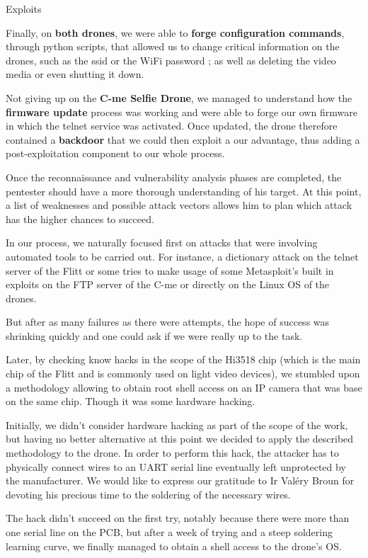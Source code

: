 \begin{chaptercover}{Exploits}
\begin{summary}
Finally, on \textbf{both drones}, we were able to \textbf{forge configuration commands}, through python scripts, that allowed us to change critical information on the drones, such as the \acrshort{ssid} or the WiFi password ; as well as deleting the video media or even shutting it down.

Not giving up on the \textbf{C-me Selfie Drone}, we managed to understand how the \textbf{firmware update} process was working and were able to forge our own firmware in which the telnet service was activated. Once updated, the drone therefore contained a \textbf{backdoor} that we could then exploit a our advantage, thus adding a post-exploitation component to our whole process.
\end{summary}

\begin{discussion}
Once the reconnaissance and vulnerability analysis phases are completed, the pentester should have a more thorough understanding of his target. At this point, a list of weaknesses and possible attack vectors allows him to plan which attack has the higher chances to succeed.

In our process, we naturally focused first on attacks that were involving automated tools to be carried out. For instance, a dictionary attack on the telnet server of the Flitt or some tries to make usage of some Metasploit’s built in exploits on the FTP server of the C-me or directly on the Linux OS of the drones.

But after as many failures as there were attempts, the hope of success was shrinking quickly and one could ask if we were really up to the task.

Later, by checking know hacks in the scope of the Hi3518 chip (which is the main chip of the Flitt and is commonly used on light video devices), we stumbled upon a methodology allowing to obtain root shell access on an IP camera that was base on the same chip. Though it was some hardware hacking.

Initially, we didn’t consider hardware hacking as part of the scope of the work, but having no better alternative at this point we decided to apply the described methodology to the drone. 
In order to perform this hack, the attacker has to physically connect wires to an UART serial line eventually left unprotected by the manufacturer. We would like to express our gratitude to Ir Valéry Broun for devoting his precious time to the soldering of the necessary wires.

The hack didn’t succeed on the first try, notably because there were more than one serial line on the PCB, but after a week of trying and a steep soldering learning curve, we finally managed to obtain a shell access to the drone’s OS.


\end{discussion}
\end{chaptercover}
